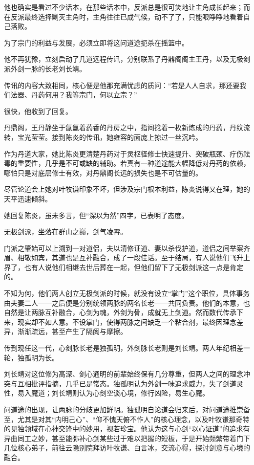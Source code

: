 他也确实是看过不少话本，在那些话本中，反派总是很可笑地让主角成长起来；而在反派最终选择剿灭主角时，主角往往已成气候，动不了了，只能眼睁睁地看着自己落败。

为了宗门的利益与发展，必须立即将这问道途扼杀在摇篮中。

他不再犹豫，立刻启动了几道远程传讯，分别联系了丹鼎阁阁主王丹，以及无极剑派外剑一脉的长老刘长靖。

传讯的内容大致相同，核心便是他那充满忧虑的质问：“若是人人自求，那还要我们法器、丹药何用？我等宗门，何以立宗？”

很快，他收到了回复。

\vspace{2em}

丹鼎阁，王丹静坐于氤氲着药香的丹房之中，指间捻着一枚新炼成的丹药，丹纹流转，宝光莹莹。接到陈炎的传讯，她雍容的面庞上掠过一丝沉吟。

作为丹道大家，她比陈炎更清楚丹药对于灵枢径修士快速提升、突破瓶颈、疗伤祛毒的重要性，几乎是不可或缺的辅助。若真有一种道途能大幅降低对丹药的依赖，哪怕只是对底层修士有效，对丹鼎阁长远的损失也是不可估量的。

尽管论道会上她对叶牧谦印象不坏，但涉及宗门根本利益，陈炎说得又在理，她的天平迅速倾斜。

她回复陈炎，虽未多言，但“深以为然”四字，已表明了态度。

\vspace{2em}

无极剑派，坐落在群山之巅，剑气凌霄。

门派之肇始可以上溯到一对道侣，夫以清修证道、妻以杀伐护道，道侣之间举案齐眉、相敬如宾，其道也是互补融合，成了一段佳话。至于结局，有人说他们飞升上界了，也有人说他们相继去世后葬在一起，但他们留下了无极剑派这一点是肯定的。

不知为何，他们两人创立无极剑派的时候，就没有设立“掌门”这个职位，具体事务由夫妻二人——之后便是分别统领两脉的两名长老——共同负责。他们的本意，也自然是让两脉互补融合，心剑为魂，外剑为骨，成就无上剑道。然而数代传承下来，现实却不如人意。不设掌门，使得两脉之间缺乏一个粘合剂，最终因理念差异，渐渐疏远，甚至产生了隔阂与摩擦。

传到现任这一代，心剑脉长老是独孤明，外剑脉长老则是刘长靖。两人年纪相差一轮，独孤明为长。

刘长靖对这位修为高深、剑心通明的前辈始终保有几分尊重，但两人之间的理念冲突与互相批评指摘，几乎已是常态。独孤明认为外剑一味追求威力，失了剑道灵性，易入魔道；刘长靖则认为心剑空谈心境，修行凶险，易生心魔。

问道途的出现，让两脉的分歧更加鲜明。独孤明自论道会归来后，对问道途推崇备至，尤其是对其“内明己心”、“仰不愧天俯不怍人”的核心理念，以及叶牧谦那奇特的见独领域在心神交锋中的妙用，视若珍宝。他认为这与心剑“以心证道”的追求有异曲同工之妙，甚至能弥补心剑某些过于难以把握的短板，于是开始频繁带着门下几位核心弟子，前往云隐别院拜访叶牧谦、白言冰，交流心得，探讨剑意与心境的融合。

